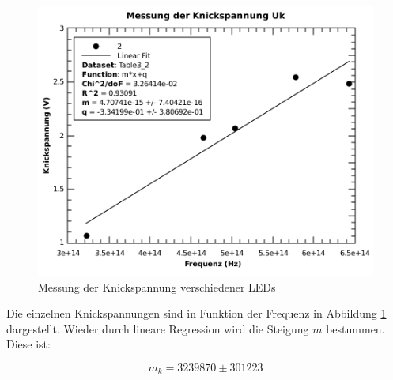 \begin{figure}[H]
    \centering
    \includegraphics[width=.5\linewidth]{images/knickspannung.pdf}
    \caption{Messung der Knickspannung verschiedener LEDs}
    \label{fig:knickspannung}
\end{figure}

Die einzelnen Knickspannungen sind  in  Funktion  der  Frequenz  in  Abbildung
\ref{fig:knickspannung} dargestellt. Wieder durch lineare Regression  wird die
Steigung $m$ bestummen. Diese ist:

\begin{equation}
    m_{k} = 3239870 \pm 301223
\end{equation}

